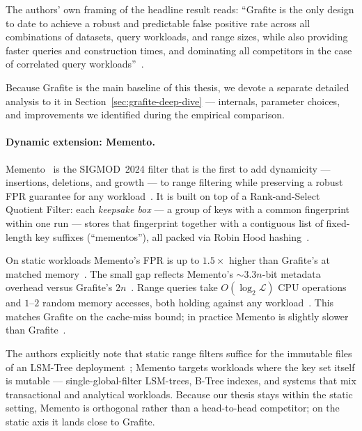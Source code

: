The authors' own framing of the headline result reads:
``Grafite is the only design to date to achieve a robust and predictable false
positive rate across all combinations of datasets, query workloads,
and range sizes, while also providing faster queries and
construction times, and dominating all competitors in the case of
correlated query workloads''~\citep[\S1]{grafite2024}.

Because Grafite is the main baseline of this thesis, we devote a
separate detailed analysis to it in
Section~\ref{sec:grafite-deep-dive} --- internals, parameter
choices, and improvements we identified during the empirical
comparison.

\paragraph{Dynamic extension: Memento.}
Memento~\citep{eslami2024memento} is the SIGMOD~2024 filter that is
the first to add dynamicity --- insertions, deletions, and growth
--- to range filtering while preserving a robust FPR guarantee for
any workload~\citep[\S1, \S4]{eslami2024memento}.
It is built on top of a Rank-and-Select Quotient Filter: each \emph{keepsake
box} --- a group of keys with a common fingerprint within one run
--- stores that fingerprint together with a contiguous list of
fixed-length key suffixes (``mementos''), all packed via Robin Hood
hashing~\citep[\S3, \S4]{eslami2024memento}.

On static workloads Memento's FPR is up to $1.5\times$ higher than
Grafite's at matched memory~\citep[\S7.1, Fig.~9]{eslami2024memento}.
The small gap reflects Memento's ${\sim}3.3n$-bit metadata overhead
versus Grafite's $2n$~\citep[\S6]{eslami2024memento}.
Range queries take $O(\log_2 \mathcal{L})$ CPU operations and
$1$--$2$ random memory accesses, both holding against any
workload~\citep[\S6, Table~2]{eslami2024memento}. This matches
Grafite on the cache-miss bound; in practice Memento is slightly
slower than Grafite~\citep[\S7.1]{eslami2024memento}.

The authors explicitly note that static range filters suffice for the immutable files of an
LSM-Tree deployment~\citep[\S2]{eslami2024memento}; Memento targets
workloads where the key set itself is mutable --- single-global-filter
LSM-trees, B-Tree indexes, and systems that mix transactional and analytical workloads.
Because our thesis stays within the static setting, Memento is
orthogonal rather than a head-to-head competitor; on the static axis
it lands close to Grafite.
